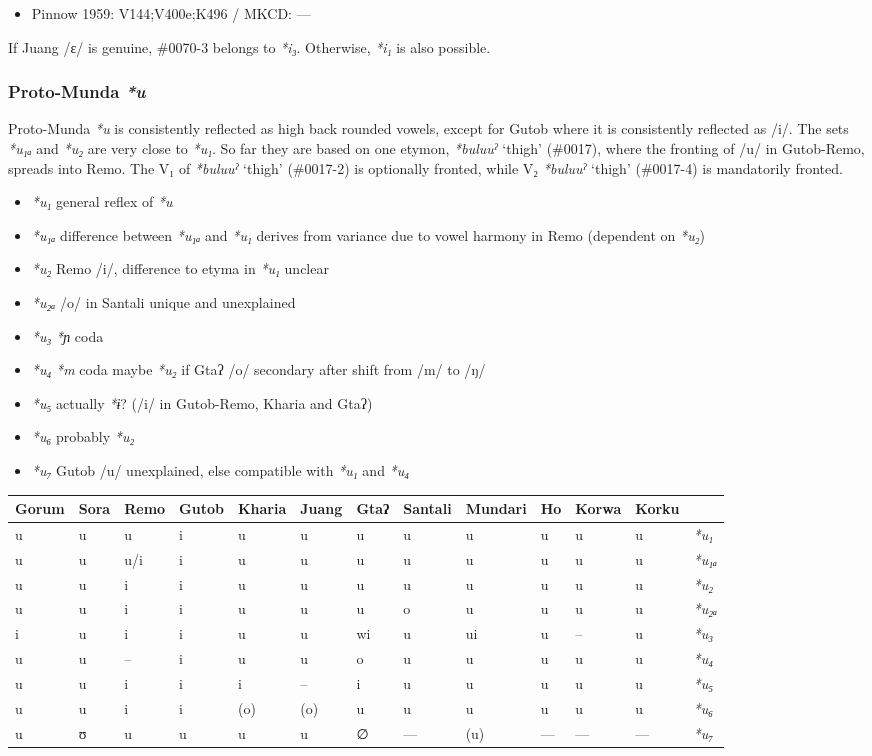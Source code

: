 \documentclass[a4paper,]{article}
\providecommand{\tightlist}{%
  \setlength{\itemsep}{0pt}\setlength{\parskip}{0pt}}
\begin{document}
\begin{itemize}
\tightlist
\item
  Pinnow 1959: V144;V400e;K496 / MKCD: ---
\end{itemize}

If Juang /ɛ/ is genuine, \#0070-3 belongs to \emph{*i₃}. Otherwise,
\emph{*i₁} is also possible.

\subsubsection{\texorpdfstring{Proto-Munda
\emph{*u}}{Proto-Munda *u}}\label{proto-munda-u}

Proto-Munda \emph{*u} is consistently reflected as high back rounded
vowels, except for Gutob where it is consistently reflected as /i/. The
sets \emph{*u₁ₐ} and \emph{*u₂} are very close to \emph{*u₁}. So far
they are based on one etymon, \emph{*buluuˀ} `thigh' (\#0017), where the
fronting of /u/ in Gutob-Remo, spreads into Remo. The V₁ of
\emph{*buluuˀ} `thigh' (\#0017-2) is optionally fronted, while V₂
\emph{*buluuˀ} `thigh' (\#0017-4) is mandatorily fronted.

\begin{itemize}
\tightlist
\item
  \emph{*u₁} general reflex of \emph{*u}
\item
  \emph{*u₁ₐ} difference between \emph{*u₁ₐ} and \emph{*u₁} derives from
  variance due to vowel harmony in Remo (dependent on \emph{*u₂})
\item
  \emph{*u₂} Remo /i/, difference to etyma in \emph{*u₁} unclear
\item
  \emph{*u₂ₐ} /o/ in Santali unique and unexplained
\item
  \emph{*u₃} \emph{*ɲ} coda
\item
  \emph{*u₄} \emph{*m} coda maybe \emph{*u₂} if Gtaʔ /o/ secondary after
  shift from /m/ to /ŋ/
\item
  \emph{*u₅} actually \emph{*ɨ}? (/i/ in Gutob-Remo, Kharia and Gtaʔ)
\item
  \emph{*u₆} probably \emph{*u₂}
\item
  \emph{*u₇} Gutob /u/ unexplained, else compatible with \emph{*u₁} and
  \emph{*u₄}
\end{itemize}

\begin{longtable}[]{@{}lllllllllllll@{}}
\toprule
Gorum & Sora & Remo & Gutob & Kharia & Juang & Gtaʔ & Santali & Mundari
& Ho & Korwa & Korku &\tabularnewline
\midrule
\endhead
u & u & u & i & u & u & u & u & u & u & u & u &
\emph{*u₁}\tabularnewline
u & u & u/i & i & u & u & u & u & u & u & u & u &
\emph{*u₁ₐ}\tabularnewline
u & u & i & i & u & u & u & u & u & u & u & u &
\emph{*u₂}\tabularnewline
u & u & i & i & u & u & u & o & u & u & u & u &
\emph{*u₂ₐ}\tabularnewline
i & u & i & i & u & u & wi & u & ui & u & -- & u &
\emph{*u₃}\tabularnewline
u & u & -- & i & u & u & o & u & u & u & u & u &
\emph{*u₄}\tabularnewline
u & u & i & i & i & -- & i & u & u & u & u & u &
\emph{*u₅}\tabularnewline
u & u & i & i & (o) & (o) & u & u & u & u & u & u &
\emph{*u₆}\tabularnewline
u & ʊ & u & u & u & u & ∅ & --- & (u) & --- & --- & --- &
\emph{*u₇}\tabularnewline
\bottomrule
\end{longtable}
\end{document}
